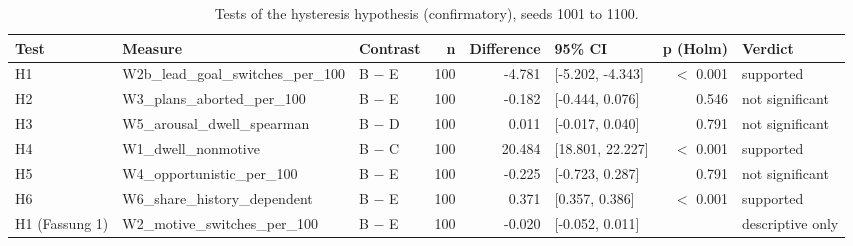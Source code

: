 \begin{table}[t]
\centering
\caption{Tests of the hysteresis hypothesis (confirmatory), seeds 1001 to 1100.}
\label{tab:T1}
\begin{tabular}{lllrrlrl}
\toprule
Test & Measure & Contrast & n & Difference & 95\% CI & p (Holm) & Verdict \\
\midrule
H1 & W2b\_lead\_goal\_switches\_per\_100 & B $-$ E & 100 & -4.781 & [-5.202, -4.343] & $<$ 0.001 & supported \\
H2 & W3\_plans\_aborted\_per\_100 & B $-$ E & 100 & -0.182 & [-0.444, 0.076] & 0.546 & not significant \\
H3 & W5\_arousal\_dwell\_spearman & B $-$ D & 100 & 0.011 & [-0.017, 0.040] & 0.791 & not significant \\
H4 & W1\_dwell\_nonmotive & B $-$ C & 100 & 20.484 & [18.801, 22.227] & $<$ 0.001 & supported \\
H5 & W4\_opportunistic\_per\_100 & B $-$ E & 100 & -0.225 & [-0.723, 0.287] & 0.791 & not significant \\
H6 & W6\_share\_history\_dependent & B $-$ E & 100 & 0.371 & [0.357, 0.386] & $<$ 0.001 & supported \\
H1 (Fassung 1) & W2\_motive\_switches\_per\_100 & B $-$ E & 100 & -0.020 & [-0.052, 0.011] &  & descriptive only \\
\bottomrule
\end{tabular}
\end{table}
